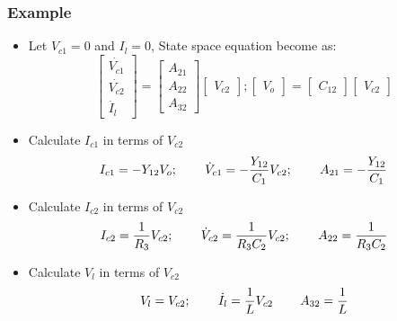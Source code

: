 \documentclass{beamer}
\begin{document}
\begin{frame}
\frametitle{Example}
\begin{small}
\begin{itemize}
\item{Let $V_{c1}=0$ and $I_l=0$, State space equation become as:} \\

\[ \left[ \begin{array}{cc}
\dot{V_{c1}} \\
\dot{V_{c2}} \\
\dot{I_l}
\end{array} \right]
=
\left[ \begin{array}{ccc}
A_{21} \\
A_{22} \\
A_{32} 
\end{array} \right]
%
\left[ \begin{array}{c}
{V_{c2}}
\end{array} \right];
\left[ \begin{array}{c}
{V_{o}}
\end{array} \right]
=
\left[ \begin{array}{c}
{C_{12}}
\end{array} \right]
\left[ \begin{array}{c}
{V_{c2}}
\end{array} \right]
\]
\item Calculate $I_{c1}$ in terms of $V_{c2}$\\
\begin{equation}
I_{c1}=-Y_{12}V_{o};\hspace{.3in} \dot{V}_{c1}=-\frac{Y_{12}}{C_1}V_{c2};\hspace{.3in} A_{21}=-\frac{Y_{12}}{C_1}
\end{equation}

\item Calculate $I_{c2}$ in terms of $V_{c2}$\\
\begin{equation}
I_{c2}=\frac{1}{R_3}V_{c2};\hspace{.3in} \dot{V}_{c2}=\frac{1}{R_3C_2}V_{c2};\hspace{.3in} A_{22}=\frac{1}{R_3C_2}
\end{equation}
\item Calculate $V_{l}$ in terms of $V_{c2}$\\
\begin{equation}
V_{l}=V_{c2};\hspace{.3in} \dot{I}_{l}=\frac{1}{L}V_{c2} \hspace{.3in} A_{32}=\frac{1}{L}
\end{equation}

\end{itemize}
\end{small}
\end{frame}
\end{document}
